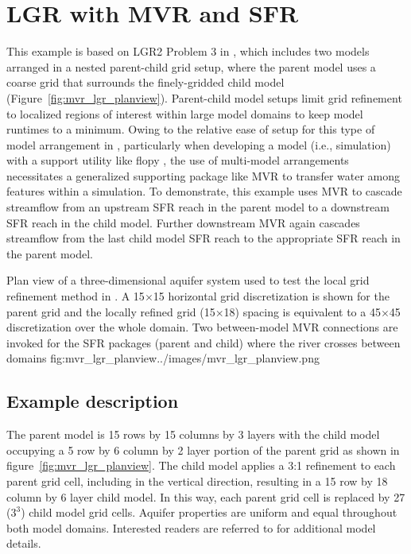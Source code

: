 \section{LGR with MVR and SFR}

This example is based on LGR2 Problem 3 in \cite{mehl2013}, which includes two models arranged in a nested parent-child grid setup, where the parent model uses a coarse grid that surrounds the finely-gridded child model (Figure~\ref{fig:mvr_lgr_planview}).  Parent-child model setups limit grid refinement to localized regions of interest within large model domains to keep model runtimes to a minimum.  Owing to the relative ease of setup for this type of model arrangement in \mf, particularly when developing a model (i.e., simulation) with a support utility like flopy \citep{bakker2016}, the use of multi-model arrangements necessitates a generalized supporting package like MVR to transfer water among features within a simulation.  To demonstrate, this example uses MVR to cascade streamflow from an upstream SFR reach in the parent model to a downstream SFR reach in the child model.  Further downstream MVR again cascades streamflow from the last child model SFR reach to the appropriate SFR reach in the parent model.  

\begin{StandardFigure}
	{Plan view of a three-dimensional aquifer system used to test the local grid refinement method in \mf. A 15$\times$15 horizontal grid discretization is shown for the parent grid and the locally refined grid (15$\times$18) spacing is equivalent to a 45$\times$45 discretization over the whole domain.  Two between-model MVR connections are invoked for the SFR packages (parent and child) where the river crosses between domains}
	{fig:mvr_lgr_planview}{../images/mvr_lgr_planview.png}
\end{StandardFigure}

\subsection{Example description}

The parent model is 15 rows by 15 columns by 3 layers with the child model occupying a 5 row by 6 column by 2 layer portion of the parent grid as shown in figure~\ref{fig:mvr_lgr_planview}.  The child model applies a 3:1 refinement to each parent grid cell, including in the vertical direction, resulting in a 15 row by 18 column by 6 layer child model.  In this way, each parent grid cell is replaced by 27 ($3^3$) child model grid cells.  Aquifer properties are uniform and equal throughout both model domains.  Interested readers are referred to \cite{mehl2013} for additional model details.  

